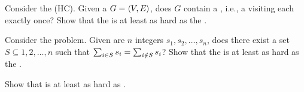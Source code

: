 \begin{exercise}
Consider the  (HC). Given a  $G=\tupl{V,E}$, does $G$ contain a , i.e., a  visiting each  exactly once? Show that the  is at least as hard as the .
\end{exercise}
\begin{exercise}
Consider the  problem. Given are $n$ integers $s_1,s_2,\ldots,s_n$, does there exist a set $S\subseteq{1,2,\ldots,n}$ such that $\isumdomain[i]{S}{s_i}=\isumndomain[i]{S}{s_i}$? Show that the  is at least as hard as the .
\end{exercise}
\begin{exercise}
Show that  is at least as hard as .
\end{exercise}